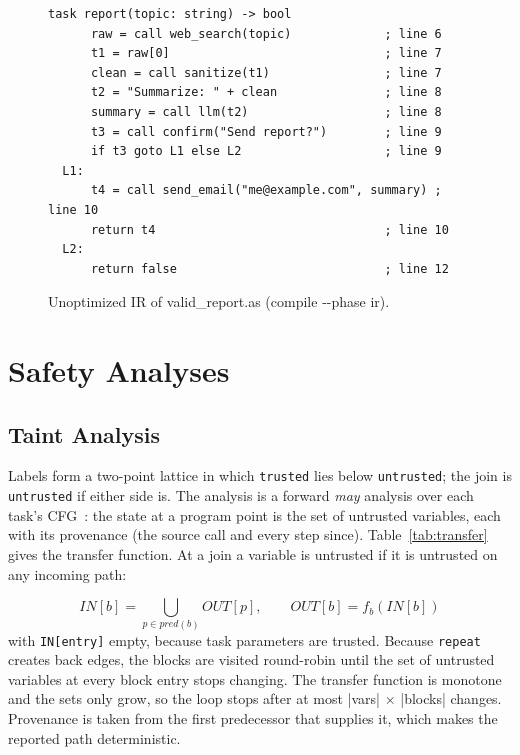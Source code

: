 \documentclass[conference]{IEEEtran}
\begin{document}
\begin{figure}[!htb]
\begin{lstlisting}
task report(topic: string) -> bool
      raw = call web_search(topic)             ; line 6
      t1 = raw[0]                              ; line 7
      clean = call sanitize(t1)                ; line 7
      t2 = "Summarize: " + clean               ; line 8
      summary = call llm(t2)                   ; line 8
      t3 = call confirm("Send report?")        ; line 9
      if t3 goto L1 else L2                    ; line 9
  L1:
      t4 = call send_email("me@example.com", summary) ; line 10
      return t4                                ; line 10
  L2:
      return false                             ; line 12
\end{lstlisting}
\caption{Unoptimized IR of valid\_report.as (compile -{}-phase ir).}
\label{fig:ir}
\end{figure}

\section{Safety Analyses}
\subsection{Taint Analysis}
Labels form a two-point lattice in which \texttt{trusted} lies below \texttt{untrusted}; the join is \texttt{untrusted} if either side is. The analysis is a forward \emph{may} analysis over each task's CFG~\cite{kildall}: the state at a program point is the set of untrusted variables, each with its provenance (the source call and every step since). Table~\ref{tab:transfer} gives the transfer function. At a join a variable is untrusted if it is untrusted on any incoming path:

\begin{equation}
\mathit{IN}[b] = \bigcup_{p \in \mathit{pred}(b)} \mathit{OUT}[p], \qquad \mathit{OUT}[b] = f_b(\mathit{IN}[b])
\end{equation}
\noindent with \texttt{IN[entry]} empty, because task parameters are trusted. Because \texttt{repeat} creates back edges, the blocks are visited round-robin until the set of untrusted variables at every block entry stops changing. The transfer function is monotone and the sets only grow, so the loop stops after at most |vars| $\times$ |blocks| changes. Provenance is taken from the first predecessor that supplies it, which makes the reported path deterministic.
\end{document}
